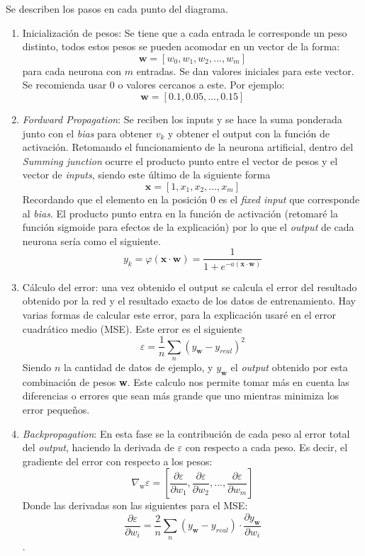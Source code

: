 \documentclass[14pt,a4paper]{report}
\begin{document}
Se describen los pasos en cada punto del diagrama.
\begin{enumerate}


\item Inicialización de pesos: Se tiene que a cada entrada le corresponde un peso distinto, todos estos pesos se pueden acomodar en un vector de la forma:$$\textbf{w}=[w_0, w_1, w_2, ..., w_m]$$ para cada neurona con $m$ entradas. Se dan valores iniciales para este vector. Se recomienda usar $0$ o valores cercanos a este. Por ejemplo:$$\textbf{w}=[0.1, 0.05, ..., 0.15]$$

\item \textit{Fordward Propagation}: Se reciben los inputs y se hace la suma ponderada junto con el \textit{bias} para obtener $v_k$ y obtener el output con la función de activación. Retomando el funcionamiento de la neurona artificial, dentro del \textit{Summing junction} ocurre el producto punto entre el vector de pesos y el vector de \textit{inputs}, siendo este último de la siguiente forma
$$
\textbf{x}=[1, x_1, x_2, ..., x_m]
$$
Recordando que el elemento en la posición 0 es el \textit{fixed input} que corresponde al \textit{bias}. El producto punto entra en la función de activación (retomaré la función sigmoide para efectos de la explicación) por lo que el \textit{output} de cada neurona sería como el siguiente.
$$
y_k = \varphi(\textbf{x}\cdot\textbf{w})=\frac{1}{1+e^{-a(\textbf{x}\cdot\textbf{w})}}
$$

\item Cálculo del error: una vez obtenido el output se calcula el error del resultado obtenido por la red y el resultado exacto de los datos de entrenamiento. Hay varias formas de calcular este error, para la explicación usaré en el error cuadrático medio (MSE). Este error es el siguiente 
$$\varepsilon = \frac{1}{n} \sum_{n}(y_{\textbf{w}}-y_{real})^{2}$$ 
Siendo $n$ la cantidad de datos de ejemplo, y $y_{\textbf{w}}$ el \textit{output} obtenido por esta combinación de pesos \textbf{w}. Este calculo nos permite tomar más en cuenta las diferencias o errores que sean más grande que uno mientras minimiza los error pequeños.

\item \textit{Backpropagation}: En esta fase se la contribución de cada peso al error total del \textit{output}, haciendo la derivada de $\varepsilon$ con respecto a cada peso. Es decir, el gradiente del error con respecto a los pesos: 
$$\nabla_{\text{w}}\varepsilon = [\frac{\partial\varepsilon}{\partial w_{1}},\frac{\partial\varepsilon}{\partial w_{2}},...,\frac{\partial\varepsilon}{\partial w_{m}}]$$ 
Donde las derivadas son las siguientes para el MSE:
$$\frac{\partial\varepsilon}{\partial w_{i}}=\frac{2}{n} \sum_{n}(y_{\textbf{w}}-y_{real})\cdot \dfrac{\partial y_{\textbf{w}}}{\partial w_{i}}$$.


\end{enumerate}
\end{document}
